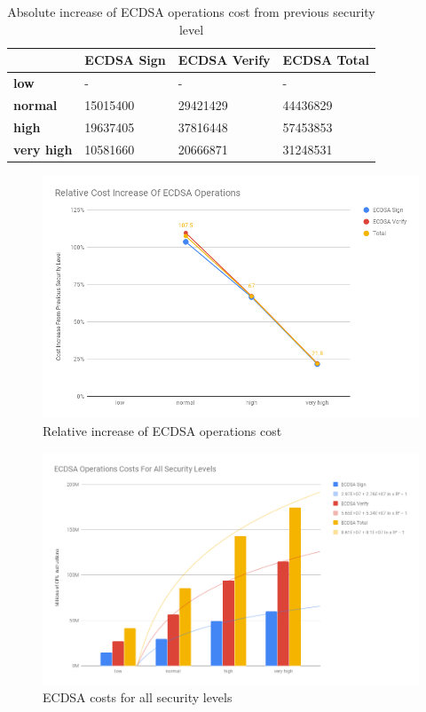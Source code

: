 \documentclass{llncs}
\begin{document}
\begin{table}[]
\begin{tabular}{|l|l|l|l|}
\hline
                   & \textbf{ECDSA Sign} & \textbf{ECDSA Verify} & \textbf{ECDSA Total} \\ \hline
\textbf{low}       & -                   & -                     & -                    \\ \hline
\textbf{normal}    & 15015400            & 29421429              & 44436829             \\ \hline
\textbf{high}      & 19637405            & 37816448              & 57453853             \\ \hline
\textbf{very high} & 10581660            & 20666871              & 31248531             \\ \hline
\end{tabular}
\caption{\label{table:ecdsa-absolute-cost-increase} Absolute increase of ECDSA operations cost from previous security level}
\end{table}

\begin{figure}
  \centering
  \includegraphics[width=1.0\textwidth]{img/ecdsa_realtive_cost_increase.png}
  \caption{\label{fig:ecdsa-relative-cost-incerase} Relative increase of ECDSA operations cost}
\end{figure}

\begin{figure}
  \centering
  \includegraphics[width=1.0\textwidth]{img/ecdsa_cost_all_sls.png}
  \caption{\label{fig:ecdsa-costs-all-sls} ECDSA costs for all security levels}
\end{figure}
\end{document}
